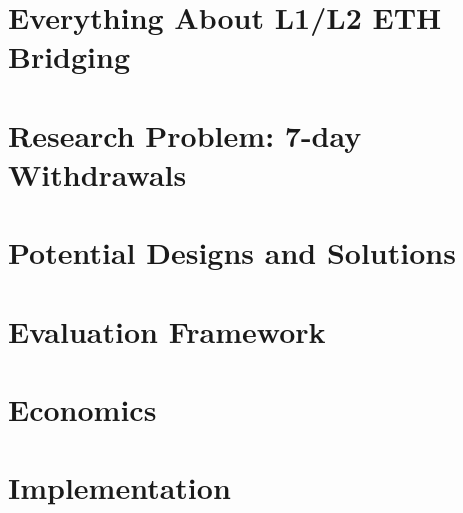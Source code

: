 


\section{Everything About L1/L2 ETH Bridging}


\section{Research Problem: 7-day Withdrawals}


\section{Potential Designs and Solutions}

\section{Evaluation Framework}

\section{Economics}


\section{Implementation}









